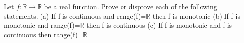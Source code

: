 Let $f: \mathbb{R}\to \mathbb{R}$ be a real function. Prove or disprove each of the following statements.
(a) If f is continuous and range(f)=$\mathbb{R}$ then f is monotonic
(b) If f is monotonic and range(f)=$\mathbb{R}$ then f is continuous
(c) If f is monotonic and f is continuous then range(f)=$\mathbb{R}$